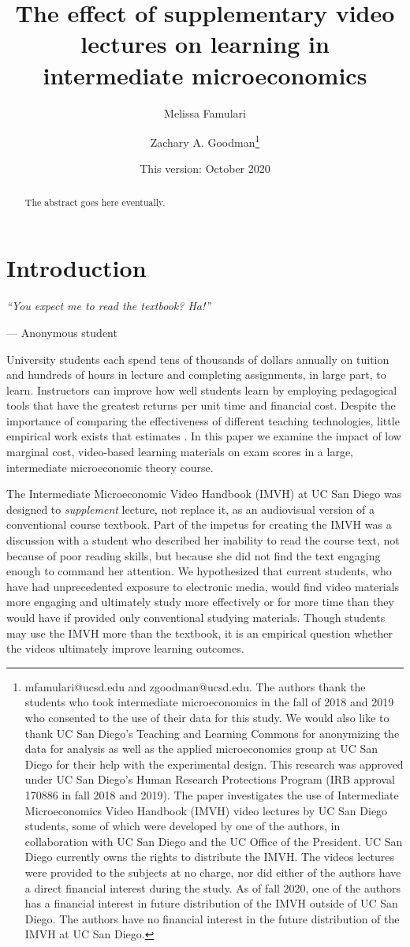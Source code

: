 \documentclass[12pt]{article}
\title{The effect of supplementary video lectures on learning in intermediate microeconomics}
\author{Melissa Famulari}
\author{Zachary A. Goodman\thanks{mfamulari@ucsd.edu and zgoodman@ucsd.edu. The authors thank the students who took intermediate microeconomics in the fall of 2018 and 2019 who consented to the use of their data for this study.  We would also like to thank UC San Diego's Teaching and Learning Commons for anonymizing the data for analysis as well as the applied microeconomics group at UC San Diego for their help with the experimental design.  This research was approved under UC San Diego's Human Research Protections Program (IRB approval 170886 in fall 2018 and 2019).  The paper investigates the use of Intermediate Microeconomics Video Handbook (IMVH) video lectures by UC San Diego students, some of which were developed by one of the authors, in collaboration with UC San Diego and the UC Office of the President.  UC San Diego currently owns the rights to distribute the IMVH.  The videos lectures were provided to the subjects at no charge, nor did either of the authors have a direct financial interest during the study.  As of fall 2020, one of the authors has a financial interest in future distribution of the IMVH outside of UC San Diego. The authors have no financial interest in the future distribution of the IMVH at UC San Diego.}}
\affil{University of California, San Diego}
\date{This version: October 2020} %
\begin{document}
\maketitle 
\begin{abstract}
	The abstract goes here eventually.
\end{abstract}

\newpage


\section{Introduction}

\epigraph{\textit{``You expect me to read the textbook? Ha!''}}{--- Anonymous student}\bigskip

University students each spend tens of thousands of dollars annually on tuition and hundreds of hours in lecture and completing assignments, in large part, to learn. Instructors can improve how well students learn by employing pedagogical tools that have the greatest returns per unit time and financial cost. Despite the importance of comparing the effectiveness of different teaching technologies, little empirical work exists that estimates . In this paper we examine the impact of low marginal cost, video-based learning materials on exam scores in a large, intermediate microeconomic theory course. %

The Intermediate Microeconomic Video Handbook (IMVH) at UC San Diego was designed to \textit{supplement} lecture, not replace it, as an audiovisual version of a conventional course textbook. Part of the impetus for creating the IMVH was a discussion with a student who described her inability to read the course text, not because of poor reading skills, but because she did not find the text engaging enough to command her attention. We hypothesized that current students, who have had unprecedented exposure to electronic media, would find video materials more engaging and ultimately study more effectively or for more time than they would have if provided only conventional studying materials. Though students may use the IMVH more than the textbook, it is an empirical question whether the videos ultimately improve learning outcomes. 
\end{document}
